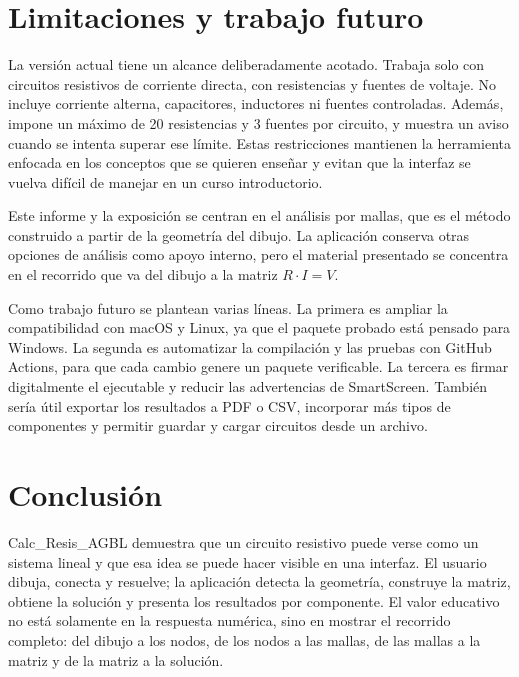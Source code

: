 \documentclass[journal]{IEEEtran}
\begin{document}
\section{Limitaciones y trabajo futuro}
\label{sec:limitaciones}

La versión actual tiene un alcance deliberadamente acotado. Trabaja solo con circuitos resistivos de corriente directa, con resistencias y fuentes de voltaje. No incluye corriente alterna, capacitores, inductores ni fuentes controladas. Además, impone un máximo de 20 resistencias y 3 fuentes por circuito, y muestra un aviso cuando se intenta superar ese límite. Estas restricciones mantienen la herramienta enfocada en los conceptos que se quieren enseñar y evitan que la interfaz se vuelva difícil de manejar en un curso introductorio.

Este informe y la exposición se centran en el análisis por mallas, que es el método construido a partir de la geometría del dibujo. La aplicación conserva otras opciones de análisis como apoyo interno, pero el material presentado se concentra en el recorrido que va del dibujo a la matriz $R \cdot I = V$.

Como trabajo futuro se plantean varias líneas. La primera es ampliar la compatibilidad con macOS y Linux, ya que el paquete probado está pensado para Windows. La segunda es automatizar la compilación y las pruebas con GitHub Actions, para que cada cambio genere un paquete verificable. La tercera es firmar digitalmente el ejecutable y reducir las advertencias de SmartScreen. También sería útil exportar los resultados a PDF o CSV, incorporar más tipos de componentes y permitir guardar y cargar circuitos desde un archivo.

\section{Conclusión}
\label{sec:conclusion}

Calc\_Resis\_AGBL demuestra que un circuito resistivo puede verse como un sistema lineal y que esa idea se puede hacer visible en una interfaz. El usuario dibuja, conecta y resuelve; la aplicación detecta la geometría, construye la matriz, obtiene la solución y presenta los resultados por componente. El valor educativo no está solamente en la respuesta numérica, sino en mostrar el recorrido completo: del dibujo a los nodos, de los nodos a las mallas, de las mallas a la matriz y de la matriz a la solución.
\end{document}
